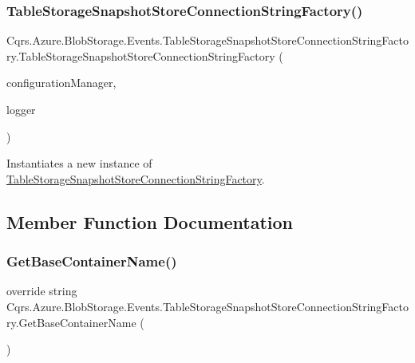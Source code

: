 \subsubsection{\texorpdfstring{Table\+Storage\+Snapshot\+Store\+Connection\+String\+Factory()}{TableStorageSnapshotStoreConnectionStringFactory()}}
{\footnotesize\ttfamily Cqrs.\+Azure.\+Blob\+Storage.\+Events.\+Table\+Storage\+Snapshot\+Store\+Connection\+String\+Factory.\+Table\+Storage\+Snapshot\+Store\+Connection\+String\+Factory (\begin{DoxyParamCaption}\item[{\hyperlink{interfaceCqrs_1_1Configuration_1_1IConfigurationManager}{I\+Configuration\+Manager}}]{configuration\+Manager,  }\item[{I\+Logger}]{logger }\end{DoxyParamCaption})}



Instantiates a new instance of \hyperlink{classCqrs_1_1Azure_1_1BlobStorage_1_1Events_1_1TableStorageSnapshotStoreConnectionStringFactory}{Table\+Storage\+Snapshot\+Store\+Connection\+String\+Factory}. 



\subsection{Member Function Documentation}
\mbox{\label{classCqrs_1_1Azure_1_1BlobStorage_1_1Events_1_1TableStorageSnapshotStoreConnectionStringFactory_af0ddf382c977759aa45d3971fb21cbed_af0ddf382c977759aa45d3971fb21cbed}} 
\subsubsection{\texorpdfstring{Get\+Base\+Container\+Name()}{GetBaseContainerName()}}
{\footnotesize\ttfamily override string Cqrs.\+Azure.\+Blob\+Storage.\+Events.\+Table\+Storage\+Snapshot\+Store\+Connection\+String\+Factory.\+Get\+Base\+Container\+Name (\begin{DoxyParamCaption}{ }\end{DoxyParamCaption})\hspace{0.3cm}{\ttfamily [virtual]}}



